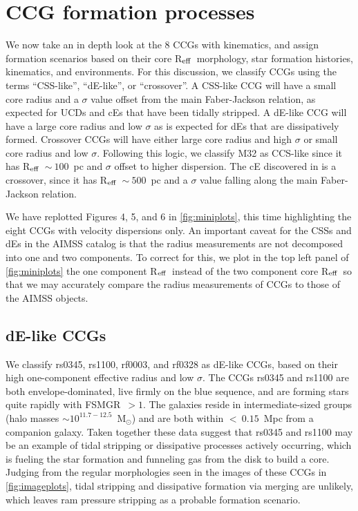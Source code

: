 \documentclass[iop,apj]{emulateapj}
\newcommand{\Reff}{R$_{\rm eff}$}
\newcommand{\Msun}{M$_{\odot}$}
\begin{document}
\section{CCG formation processes} %
\label{discussion}

We now take an in depth look at the 8 CCGs with kinematics, and assign formation scenarios based on their core \Reff\, morphology, star formation histories, kinematics, and environments. For this discussion, we classify CCGs using the terms ``CSS-like'', ``dE-like'', or ``crossover''.  A CSS-like CCG will have a small core radius and a $\sigma$ value offset from the main Faber-Jackson relation, as expected for UCDs and cEs that have been tidally stripped. A dE-like CCG will have a large core radius and low $\sigma$ as is expected for dEs that are dissipatively formed. Crossover CCGs will have either large core radius and high $\sigma$ or small core radius and low $\sigma$. Following this logic, we classify M32 as CCS-like since it has \Reff~$\sim~100$~pc and $\sigma$ offset to higher dispersion. The cE discovered in \citet{Huxor2013} is a crossover, since it has \Reff~$\sim~500$~pc and a $\sigma$ value falling along the main Faber-Jackson relation.

We have replotted Figures 4, 5, and 6 in \autoref{fig:miniplots}, this time highlighting the eight CCGs with velocity dispersions only. An important caveat for the CSSs and dEs in the AIMSS catalog is that the radius measurements are not decomposed into one and two components. To correct for this, we plot in the top left panel of \autoref{fig:miniplots} the one component \Reff\ instead of the two component core \Reff\ so that we may accurately compare the radius measurements of CCGs to those of the AIMSS objects.

\subsection{dE-like CCGs}
We classify rs0345, rs1100, rf0003, and rf0328 as dE-like CCGs, based on their high one-component effective radius and low $\sigma$. The CCGs rs0345 and rs1100 are both envelope-dominated, live firmly on the blue sequence, and are forming stars quite rapidly with FSMGR~$>1$. The galaxies reside in intermediate-sized groups (halo masses $\sim10^{11.7-12.5}$~\Msun) and are both within $<~0.15$~Mpc from a companion galaxy. Taken together these data suggest that rs0345 and rs1100 may be an example of tidal stripping or dissipative processes actively occurring, which is fueling the star formation and funneling gas from the disk to build a core. Judging from the regular morphologies seen in the images of these CCGs in \autoref{fig:imageplots}, tidal stripping and dissipative formation via merging are unlikely, which leaves ram pressure stripping as a probable formation scenario.
\end{document}
